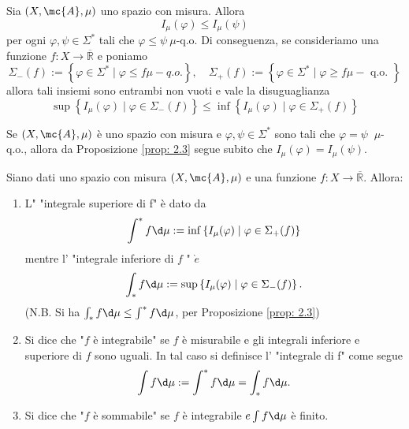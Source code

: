 \begin{proposition}[$*$]\label{prop: 2.3}
    Sia $(X, \mc{A}, \mu)$ uno spazio con misura. Allora
    \[
    I_{\mu}(\varphi) \leq I_{\mu}(\psi)
    \]
    per ogni $\varphi, \psi \in \Sigma^{*}$ tali che $\varphi \leq \psi \ \mu$-q.o. Di conseguenza, se consideriamo una funzione $f: X \rightarrow \overline{\mathbb{R}}$ e poniamo
    \[
    \Sigma_{-}(f):=\left\{\varphi \in \Sigma^{*} \mid \varphi \leq f \mu-q . o .\right\}, \quad \Sigma_{+}(f):=\left\{\varphi \in \Sigma^{*} \mid \varphi \geq f \mu-\text { q.o. }\right\}
    \]
    allora tali insiemi sono entrambi non vuoti e vale la disuguaglianza
    \[
    \sup \left\{I_{\mu}(\varphi) \mid \varphi \in \Sigma_{-}(f)\right\} \leq \inf \left\{I_{\mu}(\varphi) \mid \varphi \in \Sigma_{+}(f)\right\}
    \]
\end{proposition}


\begin{oss}
    Se $(X, \mc{A}, \mu)$ è uno spazio con misura e $\varphi, \psi \in \Sigma^{*}$ sono tali che $\varphi=\psi$ $\ \mu$-q.o., allora da Proposizione \ref{prop: 2.3} segue subito che $I_{\mu}(\varphi)=I_{\mu}(\psi)$.
\end{oss}

\begin{boxdef}
    Siano dati uno spazio con misura $(X, \mc{A}, \mu)$ e una funzione $f: X \rightarrow \overline{\mathbb{R}}$. Allora:
    
    \begin{enumerate}[label=$(\roman*)$]
        \item L" "integrale superiore di f" è dato da
        \[
        \int^{*} f \d \mu:=\inf \left\{I_{\mu}(\varphi) \mid \varphi \in \Sigma_{+}(f)\right\}
        \]
        mentre l' "integrale inferiore di $f$ " $\grave{e}$
        \[
        \int_{*} f \d \mu:=\sup \left\{I_{\mu}(\varphi) \mid \varphi \in \Sigma_{-}(f)\right\} .
        \]
        (N.B. Si ha $\int_{*} f \d \mu \leq \int^{*} f \d \mu$, per Proposizione \ref{prop: 2.3})
        \item Si dice che "$f$ è integrabile" se $f$ è misurabile e gli integrali inferiore e superiore di $f$ sono uguali. In tal caso si definisce l' "integrale di f" come segue
        \[
        \int f \d \mu:=\int^{*} f \d \mu=\int_{*} f \d \mu .
        \]
        \item Si dice che "$f$ è sommabile" se $f$ è integrabile $e \int f \d \mu$ è finito.
    \end{enumerate}
\end{boxdef}

